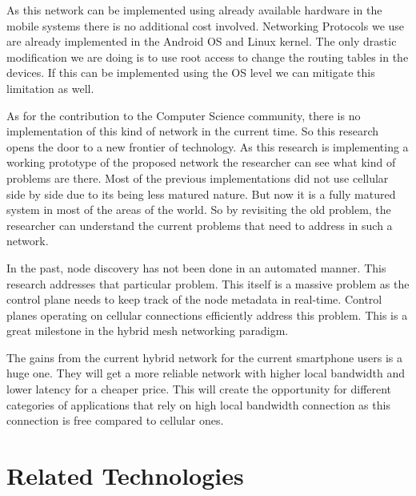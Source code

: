\vspace{12pt}
As this network can be implemented using already available hardware in the mobile systems there is no additional cost involved. Networking Protocols we use are already implemented in the Android OS and Linux kernel. The only drastic modification we are doing is to use root access to change the routing tables in the devices. If this can be implemented using the OS level we can mitigate this limitation as well.

\vspace{12pt}
As for the contribution to the Computer Science community, there is no implementation of this kind of network in the current time. So this research opens the door to a new frontier of technology. As this research is implementing a working prototype of the proposed network the researcher can see what kind of problems are there. Most of the previous implementations did not use cellular side by side due to its being less matured nature. But now it is a fully matured system in most of the areas of the world. So by revisiting the old problem, the researcher can understand the current problems that need to address in such a network. 

\vspace{12pt}
In the past, node discovery has not been done in an automated manner. This research addresses that particular problem. This itself is a massive problem as the control plane needs to keep track of the node metadata in real-time. Control planes operating on cellular connections efficiently address this problem. This is a great milestone in the hybrid mesh networking paradigm. 

\vspace{12pt}
The gains from the current hybrid network for the current smartphone users is a huge one. They will get a more reliable network with higher local bandwidth and lower latency for a cheaper price. This will create the opportunity for different categories of applications that rely on high local bandwidth connection as this connection is free compared to cellular ones.



\vspace{12pt}

\section{Related Technologies}
\vspace{12pt}


\vspace{12pt}


